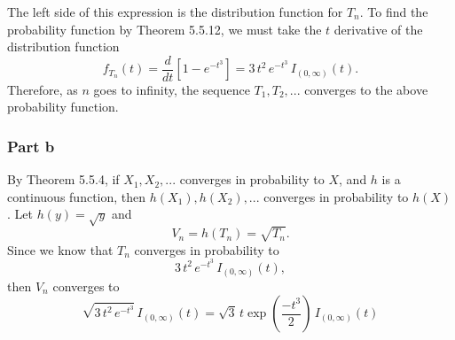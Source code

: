\documentclass{article}
\begin{document}
The left side of this expression is the distribution function for $T_n$. To find the probability function by Theorem 5.5.12, we must take the $t$ derivative of the distribution function
\[f_{T_n}(t) = \frac{d}{dt}\left[1 - e^{-t^3}\right] = 3\,t^2\,e^{-t^3}\,I_{(0,\infty)}(t).\]
Therefore, as $n$ goes to infinity, the sequence $T_1, T_2, ...$ converges to the above probability function. 

\subsubsection*{Part b}
By Theorem 5.5.4, if $X_1, X_2, ...$ converges in probability to $X$, and $h$ is a continuous function, then $h(X_1), h(X_2), ...$ converges in probability to $h(X)$. Let $h(y) = \sqrt{y}$ and 
\[V_n = h(T_n) = \sqrt{T_n}.\] Since we know that $T_n$ converges in probability to 
\[3\,t^2\,e^{-t^3}\,I_{(0,\infty)}(t),\] then $V_n$ converges to 
\[\sqrt{ 3\,t^2\,e^{-t^3}}\,I_{(0,\infty)}(t) = \sqrt{3}\,t\exp{\left(\frac{-t^3}{2}\right)}\,I_{(0,\infty)}(t)\]




\iffalse
Since the $X_i$ are independent of each other, the probability that all $X_i$ in the series $X_1, X_2, ... , X_n$ are less than $x$ is \[P\left(\text{max}\{X_1, ... , X_n\} < x\right) = \left((x-1)^3 + 1\right)^n.\]
This is the definition of a distribution function 
\[F_{\text{max}}(x) = \begin{cases}
0, &x < 0 \\
\left((x-1)^3 + 1\right)^n, &0\leq x \leq1 \\
1, & x > 1.\end{cases}\] The limit of this distribution in $n$ is 
\[F_{\text{max}}(x) = \begin{cases}
0, &x < 1 \\1, & x \geq 1.\end{cases}\]
\fi

\iffalse
, we can determine the probability that any one $_i$ is more than $\epsilon$ away from the maximum possible value, $1$. We can say that for all $X_i$ with $0<i<n$,
\[ P(X_i \leq 1 - \epsilon) = \left((1-\epsilon)-1\right)^3+1 = 1 - \epsilon^3\] for $x = 1 - \epsilon; \,\,0 \leq \epsilon \leq 1$. Since the $X_i$ are independent of each other, the probability that all $X_i$ in the series $X_1, X_2, ... , X_n$ are less than $1-\epsilon$ is \[P\left(\text{max}\{X_1, ... , X_n\} < 1 - \epsilon\right) = \left(1-\epsilon^3\right)^n.\]
This is the definition of a distribution function \[F_{\text{max}}(1-\epsilon) = \left(1-\epsilon^3\right)^n\,I_\epsilon(0,1).\] The distribution function for $T_n$ can thus be obtained as 
\[T_n(1-\epsilon) = n^{1/3}\left(1-\left(1-\epsilon^3\right)^n\right)\,I_\epsilon(0,1).\]
\fi
\end{document}
